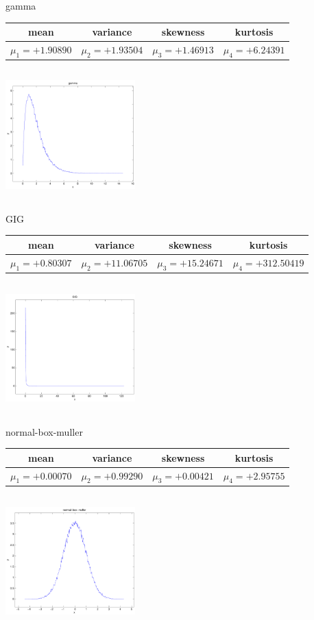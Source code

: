 \documentclass[9pt]{article}
\theoremstyle{plain}
\theoremstyle{definition}
\theoremstyle{remark}
\numberwithin{equation}{section}
\begin{document}
\newpage
gamma \begin{tabular}{|c|c|c|c|}  mean & variance & skewness & kurtosis \\  \hline
$\mu_1 = +1.90890$ & $\mu_2 = +1.93504$ & $\mu_3 = +1.46913$ & $\mu_4 =+6.24391$ \\
\end{tabular}

\includegraphics[width=5cm,height=5cm]{gamma.pdf}

GIG \begin{tabular}{|c|c|c|c|}  mean & variance & skewness & kurtosis \\  \hline
$\mu_1 = +0.80307$ & $\mu_2 = +11.06705$ & $\mu_3 = +15.24671$ & $\mu_4 =+312.50419$ \\
\end{tabular}

\includegraphics[width=5cm,height=5cm]{GIG.pdf}

normal-box-muller \begin{tabular}{|c|c|c|c|}  mean & variance & skewness & kurtosis \\  \hline
$\mu_1 = +0.00070$ & $\mu_2 = +0.99290$ & $\mu_3 = +0.00421$ & $\mu_4 =+2.95755$ \\
\end{tabular}

\includegraphics[width=5cm,height=5cm]{normal-box-muller.pdf}
\end{document}
